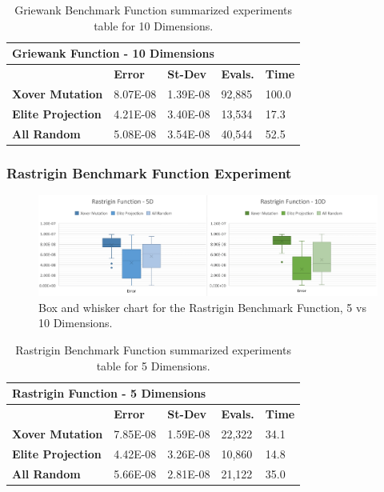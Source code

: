 \documentclass[graybox]{svmult}
\begin{document}
\begin{table}[]
    \scriptsize
    \centering
    \caption{Griewank Benchmark Function summarized experiments table for 10 Dimensions.}\label{tab.fun_griewank10}
    \begin{tabular}{@{}lllll@{}}
    \toprule
    \multicolumn{5}{l}{\textbf{Griewank Function - 10 Dimensions}} \\ \midrule
     & \textbf{Error} & \textbf{St-Dev} & \textbf{Evals.} & \textbf{Time} \\
    \textbf{Xover Mutation} & 8.07E-08 & 1.39E-08 & 92,885 & 100.0 \\
    \textbf{Elite Projection} & 4.21E-08 & 3.40E-08 & 13,534 & 17.3 \\
    \textbf{All Random} & 5.08E-08 & 3.54E-08 & 40,544 & 52.5 \\ \bottomrule
    \end{tabular}
    \end{table}


\subsubsection{Rastrigin Benchmark Function Experiment}

\begin{figure}
    \includegraphics[width=\linewidth, frame]{img/fig_fun_rastrigin.pdf}
    \caption{Box and whisker chart for the Rastrigin Benchmark Function, 5 vs 10 Dimensions.} \label{fig.fun_rastrigin}
    \end{figure}

\begin{table}[]
    \scriptsize
    \centering
    \caption{Rastrigin Benchmark Function summarized experiments table for 5 Dimensions.}\label{tab.fun_rastrigin5}
    \begin{tabular}{@{}lllll@{}}
    \toprule
    \multicolumn{5}{l}{\textbf{Rastrigin Function - 5 Dimensions}} \\ \midrule
     & \textbf{Error} & \textbf{St-Dev} & \textbf{Evals.} & \textbf{Time} \\
    \textbf{Xover Mutation} & 7.85E-08 & 1.59E-08 & 22,322 & 34.1 \\
    \textbf{Elite Projection} & 4.42E-08 & 3.26E-08 & 10,860 & 14.8 \\
    \textbf{All Random} & 5.66E-08 & 2.81E-08 & 21,122 & 35.0 \\ \bottomrule
    \end{tabular}
    \end{table}
\end{document}
